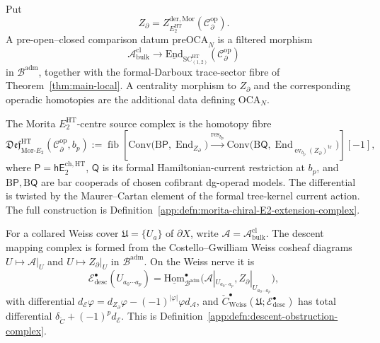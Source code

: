 \begin{defn}\label{defn:global-deligne-source-complexes}
  Put
  \[
    Z_\partial=
    Z^{\mathrm{der},\mathrm{Mor}}_{E_2^{\mathrm{HT}}}
    (\mathcal C^{\mathrm{op}}_\partial).
  \]
  A pre-open--closed comparison datum \(\mathrm{preOCA}_N\) is a
  filtered morphism
  \[
    \mathcal A^{\mathrm{cl}}_{\mathrm{bulk}}
    \longrightarrow
    \underline{\mathrm{End}}_{\mathrm{SC}^{\mathrm{HT}}_{(1,2)}}
    (\mathcal C^{\mathrm{op}}_\partial)
  \]
  in \(\mathcal B^{\mathrm{adm}}\), together with the
  formal-Darboux trace-sector fibre of Theorem~\ref{thm:main-local}.
  A centrality morphism to \(Z_\partial\) and the corresponding operadic
  homotopies are the additional data defining \(\mathrm{OCA}_N\).

  The Morita \(E_2^{\mathrm{HT}}\)-centre source complex is the homotopy fibre
  \[
    \mathfrak{Def}^{\mathrm{HT}}_{\mathrm{Mor}\mbox{-}E_2}
    (\mathcal C^{\mathrm{op}}_\partial,b_p)
    :=
    \operatorname{fib}\!\left[
    \mathrm{Conv}\bigl(\mathrm B\mathsf P,
      \operatorname{End}_{Z_\partial}\bigr)
    \xrightarrow{\operatorname{res}_{b_p}}
    \mathrm{Conv}\bigl(\mathrm B\mathsf Q,
      \operatorname{End}_{\operatorname{ev}_{b_p}(Z_\partial)^{\mathrm{tr}}}
      \bigr)\right][-1],
  \]
  where \(\mathsf P=\mathsf{hE}_2^{\mathrm{ch},\mathrm{HT}}\),
  \(\mathsf Q\) is its formal Hamiltonian-current restriction at
  \(b_p\), and \(\mathrm B\mathsf P,\mathrm B\mathsf Q\) are bar
  cooperads of chosen cofibrant dg-operad models.  The differential is
  twisted by the Maurer--Cartan element of the formal tree-kernel
  current action.  The full construction is
  Definition~\ref{app:defn:morita-chiral-E2-extension-complex}.

  For a collared Weiss cover \(\mathfrak U=\{U_a\}\) of
  \(\partial X\), write
  \(\mathcal A=\mathcal A^{\mathrm{cl}}_{\mathrm{bulk}}\).  The descent
  mapping complex is formed from the Costello--Gwilliam Weiss cosheaf
  diagrams \(U\mapsto\mathcal A|_U\) and
  \(U\mapsto Z_\partial|_U\) in \(\mathcal B^{\mathrm{adm}}\).  On the
  Weiss nerve it is
  \[
    \mathcal E^\bullet_{\mathrm{desc}}(U_{a_0\cdots a_p})
    =
    \underline{\mathrm{Hom}}_{\mathcal B^{\mathrm{adm}}}^{\bullet}
    \bigl(
      \mathcal A|_{U_{a_0\cdots a_p}},
      Z_\partial|_{U_{a_0\cdots a_p}}\bigr),
  \]
  with differential
  \(d_{\mathcal E}\varphi=d_{Z_\partial}\varphi
  -(-1)^{|\varphi|}\varphi d_{\mathcal A}\), and
  \(\check C^\bullet_{\mathrm{Weiss}}(\mathfrak U;
  \mathcal E^\bullet_{\mathrm{desc}})\) has total differential
  \(\delta_{\check C}+(-1)^p d_{\mathcal E}\).
  This is Definition~\ref{app:defn:descent-obstruction-complex}.


\end{defn}
